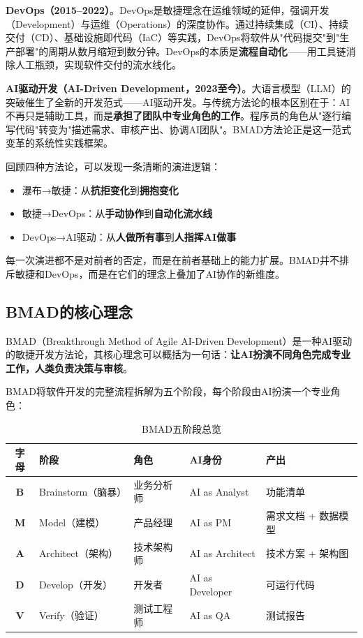 \textbf{DevOps（2015--2022）}。DevOps是敏捷理念在运维领域的延伸，强调开发（Development）与运维（Operations）的深度协作。通过持续集成（CI）、持续交付（CD）、基础设施即代码（IaC）等实践，DevOps将软件从"代码提交"到"生产部署"的周期从数月缩短到数分钟。DevOps的本质是\textbf{流程自动化}——用工具链消除人工瓶颈，实现软件交付的流水线化。

\textbf{AI驱动开发（AI-Driven Development，2023至今）}。大语言模型（LLM）的突破催生了全新的开发范式——AI驱动开发。与传统方法论的根本区别在于：AI不再只是辅助工具，而是\textbf{承担了团队中专业角色的工作}。程序员的角色从"逐行编写代码"转变为"描述需求、审核产出、协调AI团队"。BMAD方法论正是这一范式变革的系统性实践框架。

\begin{theorybox}[方法论演进的核心逻辑]
回顾四种方法论，可以发现一条清晰的演进逻辑：
\begin{itemize}[leftmargin=2em]
  \item 瀑布→敏捷：从\textbf{抗拒变化}到\textbf{拥抱变化}
  \item 敏捷→DevOps：从\textbf{手动协作}到\textbf{自动化流水线}
  \item DevOps→AI驱动：从\textbf{人做所有事}到\textbf{人指挥AI做事}
\end{itemize}
每一次演进都不是对前者的否定，而是在前者基础上的能力扩展。BMAD并不排斥敏捷和DevOps，而是在它们的理念上叠加了AI协作的新维度。
\end{theorybox}

\subsection{BMAD的核心理念}

BMAD（Breakthrough Method of Agile AI-Driven Development）是一种AI驱动的敏捷开发方法论，其核心理念可以概括为一句话：\textbf{让AI扮演不同角色完成专业工作，人类负责决策与审核}。

BMAD将软件开发的完整流程拆解为五个阶段，每个阶段由AI扮演一个专业角色：

\begin{table}[H]
\centering
\begin{tabular}{cllll}
\toprule
\textbf{字母} & \textbf{阶段} & \textbf{角色} & \textbf{AI身份} & \textbf{产出} \\
\midrule
\textbf{B} & Brainstorm（脑暴） & 业务分析师 & AI as Analyst & 功能清单 \\
\textbf{M} & Model（建模） & 产品经理 & AI as PM & 需求文档 + 数据模型 \\
\textbf{A} & Architect（架构） & 技术架构师 & AI as Architect & 技术方案 + 架构图 \\
\textbf{D} & Develop（开发） & 开发者 & AI as Developer & 可运行代码 \\
\textbf{V} & Verify（验证） & 测试工程师 & AI as QA & 测试报告 \\
\bottomrule
\end{tabular}
\caption{BMAD五阶段总览}
\end{table}

